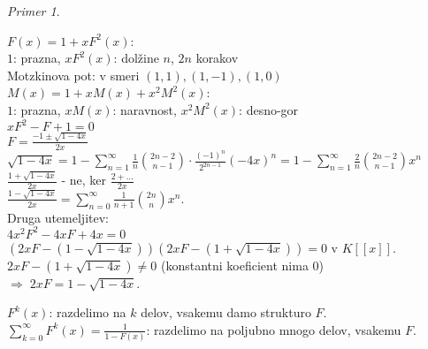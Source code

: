 \documentclass[a4paper, 12pt]{book}
\theoremstyle{definition}
\theoremstyle{remark}
\newtheorem*{ex}{Primer}
\begin{document}
\begin{ex}
\begin{enumerate}[label=(\arabic*)]
      $F(x) = 1 + x F^2(x)$: \\
      $1$: prazna, $xF^2(x)$: dolžine $n$, $2n$ korakov \\
      Motzkinova pot: v smeri $(1,1), (1,-1), (1,0)$ \\
      $M(x) = 1 + x M(x) + x^2 M^2(x)$: \\
      $1$: prazna, $x M(x)$: naravnost, $x^2 M^2(x)$: desno-gor \\
      $x F^2 - F + 1 = 0$ \\
      $F = \frac{-1 \pm \sqrt{1-4x}}{2x}$ \\
      $\sqrt{1-4x} = 1 - \sum_{n=1}^{\infty} \frac{1}{n} \binom{2n-2}{n-1} \cdot \frac{(-1)^n}{2^{2n-1}} (-4x)^n
        = 1 - \sum_{n=1}^{\infty} \frac{2}{n} \binom{2n-2}{n-1} x^n$ \\
      $\frac{1+\sqrt{1-4x}}{2x}$ - ne, ker $\frac{2 + \dots}{2x}$ \\
      $\frac{1-\sqrt{1-4x}}{2x} = \sum_{n=0}^{\infty} \frac{1}{n+1} \binom{2n}{n} x^n$. \\
      Druga utemeljitev: \\
      $4 x^2 F^2 - 4 x F + 4 x = 0$ \\
      $\left(2xF - \left(1-\sqrt{1-4x}\right)\right) \left(2xF - \left(1+\sqrt{1-4x}\right)\right) = 0$ v $K[[x]]$. \\
      $2xF - \left(1+\sqrt{1-4x}\right) \neq 0$ (konstantni koeficient nima $0$) \\
      $\Longrightarrow \; 2 x F = 1 - \sqrt{1-4x}$.
  \end{enumerate}
\end{ex}
$F^k(x)$: razdelimo na $k$ delov, vsakemu damo strukturo $F$. \\
$\sum_{k=0}^{\infty} F^k(x) = \frac{1}{1-F(x)}$: razdelimo na poljubno mnogo delov, vsakemu $F$.
\end{document}
